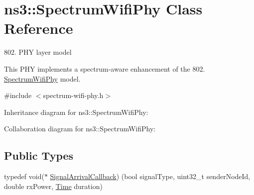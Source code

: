 \hypertarget{classns3_1_1SpectrumWifiPhy}{}\section{ns3\+:\+:Spectrum\+Wifi\+Phy Class Reference}
\label{classns3_1_1SpectrumWifiPhy}


802. P\+HY layer model

This P\+HY implements a spectrum-\/aware enhancement of the 802. \hyperlink{classns3_1_1SpectrumWifiPhy}{Spectrum\+Wifi\+Phy} model.  




{\ttfamily \#include $<$spectrum-\/wifi-\/phy.\+h$>$}



Inheritance diagram for ns3\+:\+:Spectrum\+Wifi\+Phy\+:


Collaboration diagram for ns3\+:\+:Spectrum\+Wifi\+Phy\+:
\subsection*{Public Types}
\begin{DoxyCompactItemize}
\item 
typedef void($\ast$ \hyperlink{classns3_1_1SpectrumWifiPhy_a72140c8b3f26575356e0293bfc7e09ac}{Signal\+Arrival\+Callback}) (bool signal\+Type, uint32\+\_\+t sender\+Node\+Id, double rx\+Power, \hyperlink{classns3_1_1Time}{Time} duration)
\end{DoxyCompactItemize}
